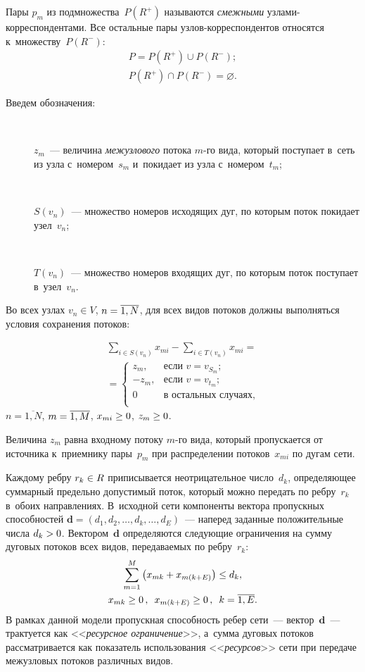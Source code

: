 \begin{multicols}{2}
Пары $p_{m}$ из подмножества~$P(R^{+})$ называются
\textit{смежными} уз\-ла\-ми-кор\-рес\-пон\-ден\-та\-ми. Все остальные пары
уз\-лов-кор\-рес\-пон\-ден\-тов относятся к~множеству~$P(R^{-})$:
\begin{gather*}
P=P(R^{+})\cup P(R^{-});\\
P(R^{+}) \cap P(R^{-}) = \varnothing.
\end{gather*}

Введем обозначения:
\begin{description}
\item[\,] $z_{m}$~--- величина \textit{межузлового} потока $m$-го вида,
который поступает в~сеть из узла с~номером~$s_{m }$ и~покидает из
узла с~номером~$t_{m}$;
\item[\,]
$S(v_{n})$~--- множество номеров исходящих дуг, по которым поток
покидает узел~$v_{n}$;
\item[\,]
$T(v_{n})$~--- множество номеров входящих дуг, по которым поток
поступает в~узел~$v_{n}$.
\end{description}

Во всех узлах $v_{n}\in V$, $n\hm=\overline{1,N}$, для всех видов
потоков долж\-ны выполняться условия сохранения потоков:

\noindent
\begin{multline}
\label{eq1} 
\sum\limits_{i\in S(v_n )} \!x_{mi}-\sum\limits_{i\in T(v_n )}\! x_{mi}
={}\\
{}=\begin{cases}
z_m, &\mbox{если } v=v^{}_{S_m}; \\
-z_m,&\mbox{если } v=v_{t_m}; \\
0&\mbox{в остальных случаях}, \\
\end{cases}
\end{multline}
$n=\overline{1,N}$, $m\hm=\overline{1,M}$, $x_{mi}\hm\ge 0$,
$z_{m}\hm\ge0$.

Величина $z_{m}$ равна входному потоку $m$-го вида, который
пропускается от источника к~приемнику пары~$p_{m}$ при
распределении потоков~$x_{mi}$ по дугам сети.

Каждому ребру $r_{k}\hm\in R$ приписывается неотрицательное чис\-ло~$d_{k}$, 
опре\-де\-ля\-ющее суммарный предельно допустимый поток,
который мож\-но передать по реб\-ру~$r_{k}$ в~обоих на\-прав\-ле\-ни\-ях. 
В~исходной сети компоненты век\-то\-ра про\-пуск\-ных способностей
$\mathbf{d}=(d_{1}, d_{2},\dots, d_{k}, \dots, d_{E})$~--- наперед
заданные положительные чис\-ла $d_{k}\hm > 0$. 
Вектором~$\mathbf{d}$ определяются сле\-ду\-ющие ограничения на сум\-му
дуговых потоков всех видов, пе\-ре\-да\-ва\-емых по реб\-ру~$r_{k}$:
\begin{multline}
\label{eq2} 
\sum\limits_{m=1}^M \left(x_{mk}+x_{m(k+E)}\right) \le d_k,\\
x_{mk} \ge 0\,,\enskip x_{m(k+E)}\ge 0\,, \enskip  k=\overline {1,E}.
\end{multline}
В рамках данной модели про\-пуск\-ная спо\-соб\-ность ребер сети~--- вектор~$\mathbf{d}$~--- 
трактуется как <<\textit{ресурсное ограничение}>>,
а~сумма дуговых
 потоков рас\-смат\-ри\-ва\-ет\-ся как показатель использования
<<\textit{ресурсов}>> сети при передаче межузловых потоков
различных видов.


\end{multicols}
